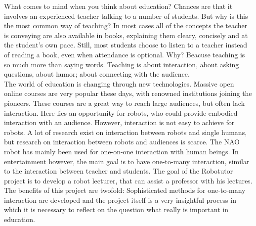 What comes to mind when you think about education? Chances are that it involves an experienced teacher talking to a number of students. But why is this the most common way of teaching? In most cases all of the concepts the teacher is conveying are also available in books, explaining them cleary, concisely and at the student's own pace. Still, most students choose to listen to a teacher instead of reading a book, even when attendance is optional. Why? Beacuse teaching is so much more than saying words. Teaching is about interaction, about asking questions, about humor; about connecting with the audience.\\

The world of education is changing through new technologies. Massive open online courses are very popular these days, with renowned institutions joining the pioneers. These courses are a great way to reach large audiences, but often lack interaction. Here lies an opportunity for robots, who could provide embodied interaction with an audience. However, interaction is not easy to achieve for robots. A lot of research exist on interaction between robots and single humans, but research on interaction between robots and audiences is scarce. The NAO robot has mainly been used for one-on-one interaction with human beings. In entertainment however, the main goal is to have one-to-many interaction, similar to the interaction between teacher and students. The goal of the Robotutor project is to develop a robot lecturer, that can assist a professor with his lectures. The benefits of this project are twofold: Sophisticated methods for one-to-many interaction are developed and the project itself is a very insightful process in which it is necessary to reflect on the question what really is important in education.

